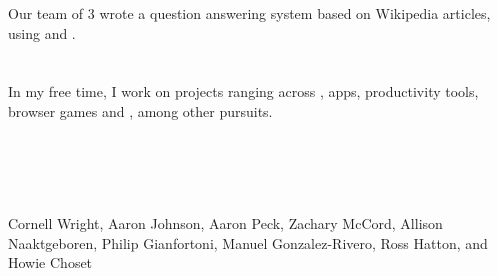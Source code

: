 \begin{resume}
Our team of 3 wrote a question answering system based on Wikipedia articles,
using  and .



\section{}
In my free time, I work on projects ranging across ,
 apps, productivity tools, browser games and , among
other pursuits.

\begin{formatb}
  \\
  \body\\
\end{formatb}

\section{}

Cornell Wright, Aaron Johnson, Aaron Peck, Zachary McCord, Allison Naaktgeboren, Philip Gianfortoni, Manuel Gonzalez-Rivero, Ross Hatton, and Howie Choset


\end{resume}
